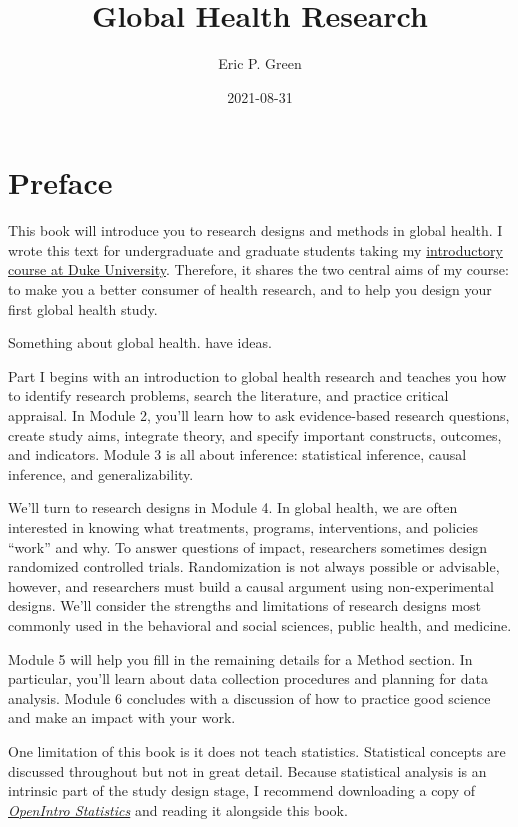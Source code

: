\documentclass[justified,twoside,symmetric,]{tufte-book}
\title{Global Health Research}
\author{Eric P. Green}
\date{2021-08-31}
\renewcommand*{\citet}[1]{{\cite{#1}}}
\begin{document}
\maketitle



{
\setcounter{tocdepth}{1}
\tableofcontents
}

\hypertarget{preface}{%
\chapter*{Preface}\label{preface}}

This book will introduce you to research designs and methods in global health. I wrote this text for undergraduate and graduate students taking my \href{http://www.globalhealthresearch.co/}{introductory course at Duke University}. Therefore, it shares the two central aims of my course: to make you a better consumer of health research, and to help you design your first global health study.

Something about global health. \citet{white:2017} have ideas.

Part I begins with an introduction to global health research and teaches you how to identify research problems, search the literature, and practice critical appraisal. In Module 2, you'll learn how to ask evidence-based research questions, create study aims, integrate theory, and specify important constructs, outcomes, and indicators. Module 3 is all about inference: statistical inference, causal inference, and generalizability.

We'll turn to research designs in Module 4. In global health, we are often interested in knowing what treatments, programs, interventions, and policies ``work'' and why. To answer questions of impact, researchers sometimes design randomized controlled trials. Randomization is not always possible or advisable, however, and researchers must build a causal argument using non-experimental designs. We'll consider the strengths and limitations of research designs most commonly used in the behavioral and social sciences, public health, and medicine.

Module 5 will help you fill in the remaining details for a Method section. In particular, you'll learn about data collection procedures and planning for data analysis. Module 6 concludes with a discussion of how to practice good science and make an impact with your work.

One limitation of this book is it does not teach statistics. Statistical concepts are discussed throughout but not in great detail. Because statistical analysis is an intrinsic part of the study design stage, I recommend downloading a copy of \href{https://www.openintro.org/stat/}{\emph{OpenIntro Statistics}} and reading it alongside this book.
\end{document}
